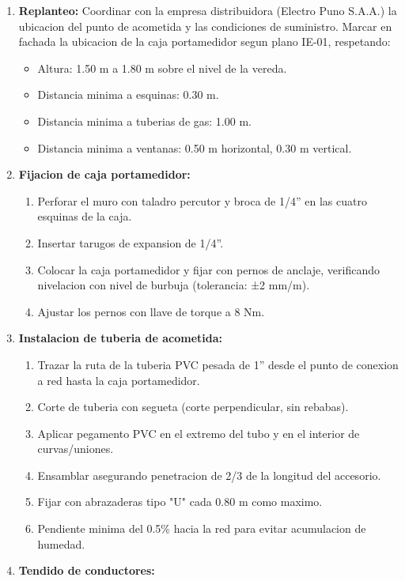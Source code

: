 \begin{enumerate}
  \item \textbf{Replanteo:} Coordinar con la empresa distribuidora (Electro Puno S.A.A.) la ubicacion del punto de acometida y las condiciones de suministro. Marcar en fachada la ubicacion de la caja portamedidor segun plano IE-01, respetando:
  \begin{itemize}
    \item Altura: 1.50 m a 1.80 m sobre el nivel de la vereda.
    \item Distancia minima a esquinas: 0.30 m.
    \item Distancia minima a tuberias de gas: 1.00 m.
    \item Distancia minima a ventanas: 0.50 m horizontal, 0.30 m vertical.
  \end{itemize}
  \item \textbf{Fijacion de caja portamedidor:}
  \begin{enumerate}
    \item Perforar el muro con taladro percutor y broca de 1/4'' en las cuatro esquinas de la caja.
    \item Insertar tarugos de expansion de 1/4''.
    \item Colocar la caja portamedidor y fijar con pernos de anclaje, verificando nivelacion con nivel de burbuja (tolerancia: ±2 mm/m).
    \item Ajustar los pernos con llave de torque a 8 Nm.
  \end{enumerate}
  \item \textbf{Instalacion de tuberia de acometida:}
  \begin{enumerate}
    \item Trazar la ruta de la tuberia PVC pesada de 1'' desde el punto de conexion a red hasta la caja portamedidor.
    \item Corte de tuberia con segueta (corte perpendicular, sin rebabas).
    \item Aplicar pegamento PVC en el extremo del tubo y en el interior de curvas/uniones.
    \item Ensamblar asegurando penetracion de 2/3 de la longitud del accesorio.
    \item Fijar con abrazaderas tipo "U" cada 0.80 m como maximo.
    \item Pendiente minima del 0.5\% hacia la red para evitar acumulacion de humedad.
  \end{enumerate}
  \item \textbf{Tendido de conductores:}

\end{enumerate}
